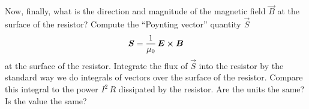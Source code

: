 \documentclass[12pt]{article}
\begin{document}
Now, finally, what is the direction and magnitude of the magnetic field $\vec{B}$
at the surface of the resistor? Compute the ``Poynting vector'' quantity $\vec{S}$
\begin{equation}
  \boldsymbol{S} = \frac{1}{\mu_0}\,\boldsymbol{E}\cross\boldsymbol{B}
\end{equation}
at the surface of the resistor.
Integrate the flux of $\vec{S}$ into the resistor by the standard way we do integrals
of vectors over the surface of the resistor.
Compare this integral to the power $I^2\,R$ dissipated by the resistor.
Are the units the same? Is the value the same?
\end{document}
